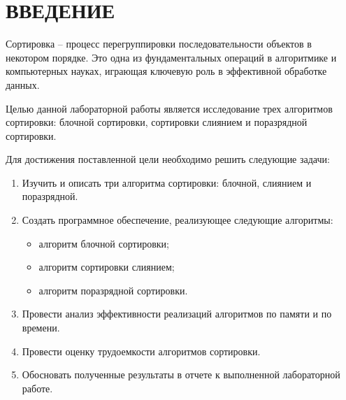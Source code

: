 \chapter*{ВВЕДЕНИЕ}

Сортировка -- процесс перегруппировки последовательности объектов в некотором порядке. Это одна из фундаментальных операций в алгоритмике и компьютерных науках, играющая ключевую роль в эффективной обработке данных.

Целью данной лабораторной работы является исследование трех алгоритмов сортировки: блочной сортировки, сортировки слиянием и поразрядной сортировки.

Для достижения поставленной цели необходимо решить следующие задачи:

\begin{enumerate}[label={\arabic*)}]
	\item Изучить и описать три алгоритма сортировки: блочной, слиянием и поразрядной.
	\item Создать программное обеспечение, реализующее следующие алгоритмы:
	\begin{itemize}[label=--]
		\item алгоритм блочной сортировки;
		\item алгоритм сортировки слиянием;
		\item алгоритм поразрядной сортировки.
	\end{itemize}

	\item Провести анализ эффективности реализаций алгоритмов по памяти и по времени.
	\item Провести оценку трудоемкости алгоритмов сортировки.
	\item Обосновать полученные результаты в отчете к выполненной лабораторной работе.
\end{enumerate}
